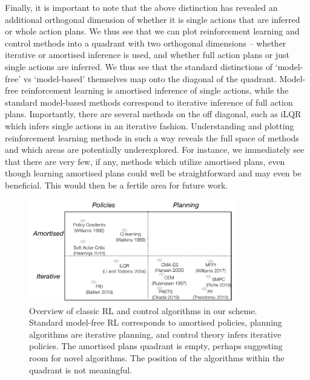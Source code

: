 Finally, it is important to note that the above distinction has revealed an additional orthogonal dimension of whether it is single actions that are inferred or whole action plans. We thus see that we can plot reinforcement learning and control methods into a quadrant with two orthogonal dimensions -- whether iterative or amortised inference is used, and whether full action plans or just single actions are inferred. We thus see that the standard distinctions of `model-free' vs `model-based' themselves map onto the diagonal of the quadrant. Model-free reinforcement learning is amortised inference of single actions, while the standard model-based methods correspond to iterative inference of full action plans. Importantly, there are several methods on the off diagonal, such as iLQR \citep{li2004iterative} which infers single actions in an iterative fashion. Understanding and plotting reinforcement learning methods in such a way reveals the full space of methods and which areas are potentially underexplored. For instance, we immediately see that there are very few, if any, methods which utilize amortised plans, even though learning amortised plans could well be straightforward and may even be beneficial. This would then be a fertile area for future work.

\begin{figure}
    \begin{center}
          \includegraphics[width=0.8\textwidth]{chapter_4_figures/quadrant_prelim_2.pdf}
    \end{center}
    \caption{Overview of classic RL and control algorithms in our scheme. Standard model-free RL corresponds to amortised policies, planning algorithms are iterative planning, and control theory infers iterative policies. The amortised plans quadrant is empty, perhaps suggesting room for novel algorithms. The position of the algorithms within the quadrant is not meaningful.}
    \label{fig:quad}
\end{figure}


